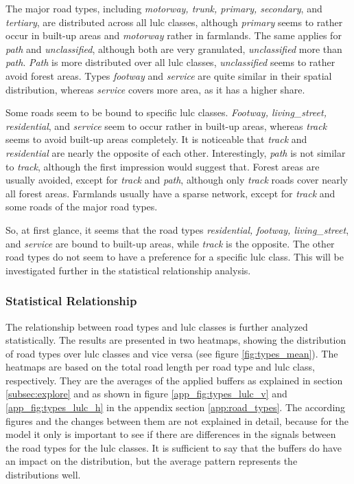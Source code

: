 The major road types, including \emph{motorway, trunk, primary, secondary}, and \emph{tertiary}, are distributed across all \gls{lulc} classes, although \emph{primary} seems to rather occur in built-up areas and \emph{motorway} rather in farmlands. The same applies for \emph{path} and \emph{unclassified}, although both are very granulated, \emph{unclassified} more than \emph{path}. \emph{Path} is more distributed over all \gls{lulc} classes, \emph{unclassified} seems to rather avoid forest areas. Types \emph{footway} and \emph{service} are quite similar in their spatial distribution, whereas \emph{service} covers more area, as it has a higher share.

Some roads seem to be bound to specific \gls{lulc} classes. \emph{Footway, living\_street, residential}, and \emph{service} seem to occur rather in built-up areas, whereas \emph{track} seems to avoid built-up areas completely. It is noticeable that \emph{track} and \emph{residential} are nearly the opposite of each other. Interestingly, \emph{path} is not similar to \emph{track}, although the first impression would suggest that. Forest areas are usually avoided, except for \emph{track} and \emph{path}, although only \emph{track} roads cover nearly all forest areas. Farmlands usually have a sparse network, except for \emph{track} and some roads of the major road types.

So, at first glance, it seems that the road types \emph{residential, footway, living\_street}, and \emph{service} are bound to built-up areas, while \emph{track} is the opposite. The other road types do not seem to have a preference for a specific \gls{lulc} class. This will be investigated further in the statistical relationship analysis.

\subsubsection*{Statistical Relationship}

The relationship between road types and \gls{lulc} classes is further analyzed statistically. The results are presented in two heatmaps, showing the distribution of road types over \gls{lulc} classes and vice versa (see figure \ref{fig:types_mean}). The heatmaps are based on the total road length per road type and \gls{lulc} class, respectively. They are the averages of the applied buffers as explained in section \ref{subsec:explore} and as shown in figure \ref{app_fig:types_lulc_v} and \ref{app_fig:types_lulc_h} in the appendix section \ref{app:road_types}. The according figures and the changes between them are not explained in detail, because for the model it only is important to see if there are differences in the signals between the road types for the \gls{lulc} classes. It is sufficient to say that the buffers do have an impact on the distribution, but the average pattern represents the distributions well.

